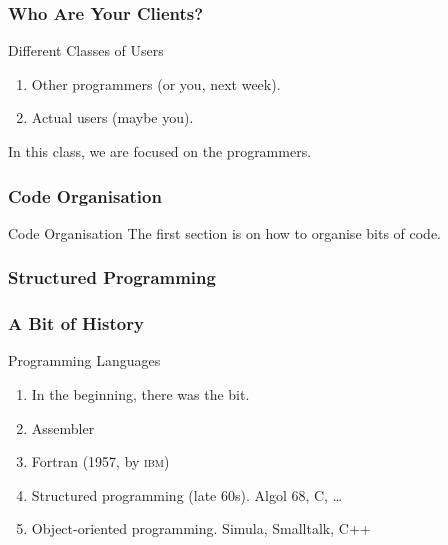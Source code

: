 \begin{frame}[fragile]
\frametitle{Who Are Your Clients?}
\begin{block}{Different Classes of Users}
\begin{enumerate}
\item Other programmers (or you, next week).
\item Actual users (maybe you).
\end{enumerate}
\end{block}

In this class, we are focused on the programmers.
\end{frame}





\begin{frame}[fragile]
\frametitle{Code Organisation}

\begin{block}{Code Organisation}
The first section is on how to organise bits of code.
\end{block}
\end{frame}



\begin{frame}[fragile]
\frametitle{Structured Programming}
\end{frame}

\begin{frame}[fragile]
\frametitle{A Bit of History}

\begin{block}{Programming Languages}
\begin{enumerate}
\item In the beginning, there was the bit.
\item Assembler
\item Fortran (1957, by \textsc{ibm})
\item Structured programming (late 60s). Algol 68, C, \ldots
\item Object-oriented programming. Simula, Smalltalk, C++ %
\end{enumerate}
\end{block}
\end{frame}

